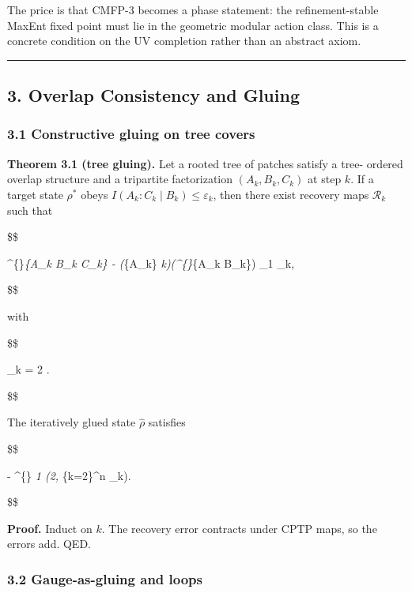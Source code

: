 \documentclass[11pt,a4paper]{article}
\theoremstyle{remark}
\begin{document}
The price is that CMFP-3 becomes a phase statement: the refinement-stable MaxEnt
fixed point must lie in the geometric modular action class. This is a concrete
condition on the UV completion rather than an abstract axiom.

\begin{center}\rule{0.5\linewidth}{0.5pt}\end{center}

\subsection{3. Overlap Consistency and Gluing}\label{overlap-consistency-and-gluing}

\subsubsection{3.1 Constructive gluing on tree covers}\label{constructive-gluing-on-tree-covers}

\textbf{Theorem 3.1 (tree gluing).} Let a rooted tree of patches satisfy a tree-
ordered overlap structure and a tripartite factorization \((A_k, B_k, C_k)\) at
step \(k\). If a target state \(\rho^{\ast}\) obeys \(I(A_k:C_k \mid B_k) \le \varepsilon_k\), then there exist
recovery maps \(\mathcal{R}_k\) such that

\$\$

\textbar{} \rho\^{}\{\ast\}\emph{\{A\_k B\_k C\_k\} - (}\{A\_k\} \otimes {}\emph{k)(\rho\^{}\{\ast\}}\{A\_k B\_k\}) \textbar\_1
\le \delta\_k,

\$\$

with

\$\$

\delta\_k = 2 .

\$\$

The iteratively glued state \(\hat{\rho}\) satisfies

\$\$

\textbar{} \hat{\rho} - \rho\^{}\{\ast\} \textbar{}\emph{1 \le \min\left(2, \sum}\{k=2\}\^{}n \delta\_k\right).

\$\$

\textbf{Proof.} Induct on \(k\). The recovery error contracts under CPTP maps, so the
errors add. QED.

\subsubsection{3.2 Gauge-as-gluing and loops}\label{gauge-as-gluing-and-loops}
\end{document}
